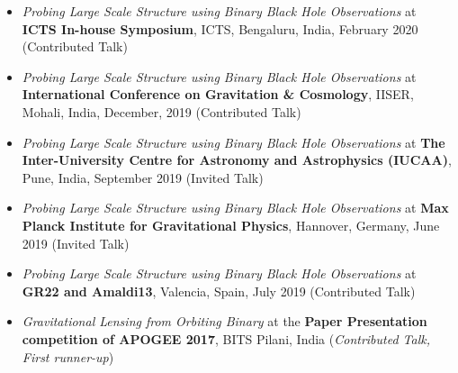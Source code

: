 \documentclass[11pt, margin, centered, letterpaper]{res}
\begin{document}
\begin{resume}
\begin{itemize}[leftmargin=*]
	 \item \textit{Probing Large Scale Structure using Binary Black Hole Observations} at \textbf{ICTS In-house Symposium}, ICTS, Bengaluru, India, February 2020 (Contributed Talk)
	 \item \textit{Probing Large Scale Structure using Binary Black Hole Observations} at \textbf{International Conference on Gravitation \& Cosmology}, IISER, Mohali, India, December, 2019 (Contributed Talk)
	 \item \textit{Probing Large Scale Structure using Binary Black Hole Observations} at \textbf{The Inter-University Centre for Astronomy and Astrophysics (IUCAA)}, Pune, India, September 2019 (Invited Talk)
	 \item \textit{Probing Large Scale Structure using Binary Black Hole Observations} at \textbf{Max Planck Institute for Gravitational Physics}, Hannover, Germany, June 2019 (Invited Talk)
	\item \textit{Probing Large Scale Structure using Binary Black Hole Observations} at \textbf{GR22 and Amaldi13}, Valencia, Spain, July 2019 (Contributed Talk)
	\item \textit{Gravitational Lensing from Orbiting Binary} at the \textbf{Paper Presentation competition of APOGEE 2017}, BITS Pilani, India (\textit{Contributed Talk, First runner-up})

\end{itemize}


\end{resume}
\end{document}
